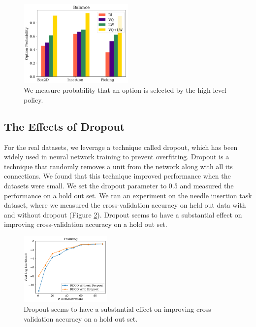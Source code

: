\begin{figure} [ht!]
\centering
    \includegraphics[width=0.5\textwidth]{ddco-experiments/exp8-3.png}
    \caption{We measure probability that an option is selected by the high-level policy. \label{fig:exp83}}
\end{figure}

\subsection*{The Effects of Dropout}
For the real datasets, we leverage a technique called dropout, which has been widely used in neural network training to prevent overfitting.
Dropout is a technique that randomly removes a unit from
the network along with all its connections.
We found that this technique improved performance when the datasets were small. We set the dropout parameter to 0.5 and measured the performance on a hold out set.
We ran an experiment on the needle insertion task dataset, where we measured the cross-validation accuracy on held out data with and without dropout (Figure \ref{fig:exp9}).
Dropout seems to have a substantial effect on improving cross-validation accuracy on a hold out set.

\begin{figure} [ht!]
\centering
    \includegraphics[width=0.4\textwidth]{ddco-experiments/exp9.png}
    \caption{Dropout seems to have a substantial effect on improving cross-validation accuracy on a hold out set. \label{fig:exp9}}
\end{figure}

